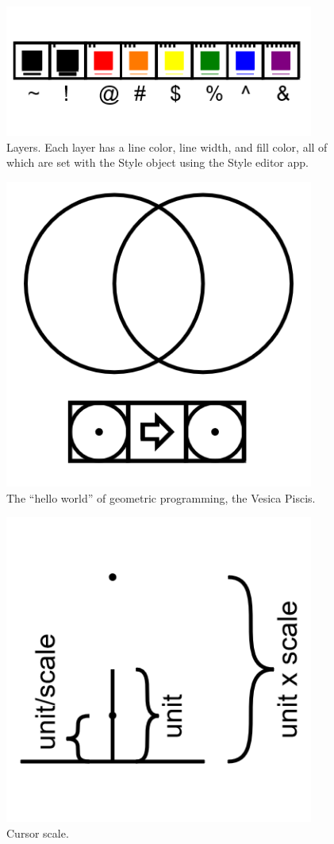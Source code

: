 \begin{figure}
	\centering
	\includegraphics[width=4in]{figures/web2d/colors.png}
	\caption[colors]
	{Layers. Each layer has a line color, line width, and fill color, all of which are set with the Style object using the Style editor app.}
\end{figure}

\begin{figure}
	\centering
	\includegraphics[width=4in]{figures/web2d/vesicapiscis.png}
	\caption[vesicapiscis]
	{The ``hello world'' of geometric programming, the Vesica Piscis.}
\end{figure}
\begin{figure}
	\centering
	\includegraphics[width=4in]{figures/web2d/cursorscale1.png}
	\caption[cursorscale]
	{Cursor scale.}
\end{figure}
